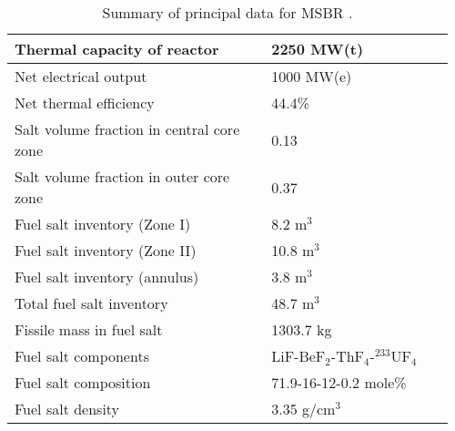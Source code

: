 \begin{table}[h!]
        \caption{Summary of principal data for MSBR \cite{robertson_conceptual_1971}.}
        \begin{tabular}{|m{0.56\linewidth} | m{0.40\linewidth}|}
        \hline [5pt]
                Thermal capacity of reactor           & 2250 MW(t)
                \\ [5pt] \hline 
                Net electrical output                 & 1000 MW(e) 
                \\ [5pt] \hline 
                Net thermal efficiency        & 44.4\%
                \\ [5pt] \hline 
                Salt volume fraction in central core zone     & 0.13
                \\ [5pt] \hline 
                Salt volume fraction in outer core zone       & 0.37
                \\ [5pt] \hline 
                Fuel salt inventory (Zone I)                  & 8.2 m$^3$	
                \\ [5pt] \hline 
                Fuel salt inventory (Zone II)                 & 10.8 m$^3$	
                \\ [5pt] \hline 
                Fuel salt inventory (annulus)                 & 3.8 m$^3$	
                \\ [5pt] \hline 
                Total fuel salt inventory                     & 48.7 m$^3$	
                \\ [5pt] \hline 
                Fissile mass in fuel salt                   & 1303.7 kg	
                \\ [5pt] \hline 
                Fuel salt components                  & 
                LiF-BeF$_2$-ThF$_4$-$^{233}$UF$_4$	
                \\ [5pt] \hline 
                Fuel salt composition                 & 
                71.9-16-12-0.2 mole\%
                \\[5pt]  \hline 
                Fuel salt density                    & 
                3.35 g/cm$^3$
                \\[5pt]  \hline 
        \end{tabular}
        \label{tab:msbr_tab}
\end{table}

